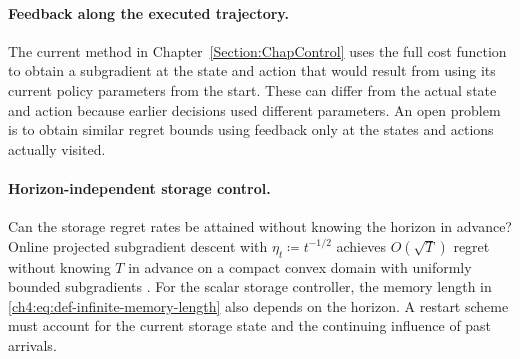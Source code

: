 \paragraph{Feedback along the executed trajectory.}
The current method in Chapter~\ref{Section:ChapControl} uses the full cost
function to obtain a subgradient at the state and action that would result
from using its current policy parameters from the start. These can differ
from the actual state and action because earlier decisions used different
parameters. An open problem is to obtain similar regret bounds using feedback
only at the states and actions actually visited.

\paragraph{Horizon-independent storage control.}
Can the storage regret rates be attained without knowing the horizon in
advance? Online projected subgradient descent with
$\eta_t\coloneqq t^{-1/2}$ achieves $O(\sqrt T)$ regret without knowing $T$ in
advance on a compact convex domain with uniformly bounded subgradients
\cite[Theorem~1]{zinkevich2003online}. For the scalar storage controller, the
memory length in
\eqref{ch4:eq:def-infinite-memory-length}
also depends on the horizon. A restart scheme must account for the current
storage state and the continuing influence of past arrivals.


